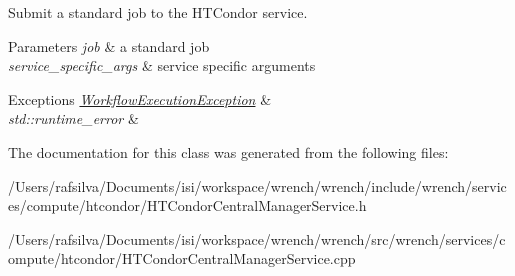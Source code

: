 Submit a standard job to the H\+T\+Condor service. 


\begin{DoxyParams}{Parameters}
{\em job} & a standard job \\
\hline
{\em service\+\_\+specific\+\_\+args} & service specific arguments\\
\hline
\end{DoxyParams}

\begin{DoxyExceptions}{Exceptions}
{\em \hyperlink{classwrench_1_1_workflow_execution_exception}{Workflow\+Execution\+Exception}} & \\
\hline
{\em std\+::runtime\+\_\+error} & \\
\hline
\end{DoxyExceptions}


The documentation for this class was generated from the following files\+:\begin{DoxyCompactItemize}
\item 
/\+Users/rafsilva/\+Documents/isi/workspace/wrench/wrench/include/wrench/services/compute/htcondor/H\+T\+Condor\+Central\+Manager\+Service.\+h\item 
/\+Users/rafsilva/\+Documents/isi/workspace/wrench/wrench/src/wrench/services/compute/htcondor/H\+T\+Condor\+Central\+Manager\+Service.\+cpp\end{DoxyCompactItemize}

